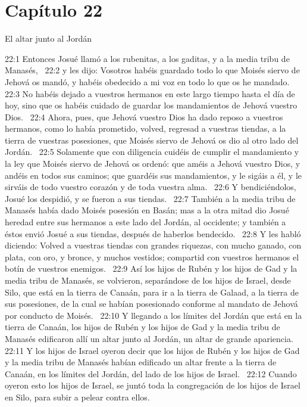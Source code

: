 \section*{Capítulo 22 }
El altar junto al Jordán  

22:1 Entonces Josué llamó a los rubenitas, a los gaditas, y a la media tribu de Manasés,  
22:2 y les dijo: Vosotros habéis guardado todo lo que Moisés siervo de Jehová os mandó, y habéis obedecido a mi voz en todo lo que os he mandado. 
22:3 No habéis dejado a vuestros hermanos en este largo tiempo hasta el día de hoy, sino que os habéis cuidado de guardar los mandamientos de Jehová vuestro Dios.  
22:4 Ahora, pues, que Jehová vuestro Dios ha dado reposo a vuestros hermanos, como lo había prometido, volved, regresad a vuestras tiendas, a la tierra de vuestras posesiones, que Moisés siervo de Jehová os dio al otro lado del Jordán.  
22:5 Solamente que con diligencia cuidéis de cumplir el mandamiento y la ley que Moisés siervo de Jehová os ordenó: que améis a Jehová vuestro Dios, y andéis en todos sus caminos; que guardéis sus mandamientos, y le sigáis a él, y le sirváis de todo vuestro corazón y de toda vuestra alma.  
22:6 Y bendiciéndolos, Josué los despidió, y se fueron a sus tiendas.  
22:7 También a la media tribu de Manasés había dado Moisés posesión en Basán; mas a la otra mitad dio Josué heredad entre sus hermanos a este lado del Jordán, al occidente; y también a éstos envió Josué a sus tiendas, después de haberlos bendecido.  
22:8 Y les habló diciendo: Volved a vuestras tiendas con grandes riquezas, con mucho ganado, con plata, con oro, y bronce, y muchos vestidos; compartid con vuestros hermanos el botín de vuestros enemigos.  
22:9 Así los hijos de Rubén y los hijos de Gad y la media tribu de Manasés, se volvieron, separándose de los hijos de Israel, desde Silo, que está en la tierra de Canaán, para ir a la tierra de Galaad, a la tierra de sus posesiones, de la cual se habían posesionado conforme al mandato de Jehová por conducto de Moisés.  
22:10 Y llegando a los límites del Jordán que está en la tierra de Canaán, los hijos de Rubén y los hijos de Gad y la media tribu de Manasés edificaron allí un altar junto al Jordán, un altar de grande apariencia.  
22:11 Y los hijos de Israel oyeron decir que los hijos de Rubén y los hijos de Gad y la media tribu de Manasés habían edificado un altar frente a la tierra de Canaán, en los límites del Jordán, del lado de los hijos de Israel.  
22:12 Cuando oyeron esto los hijos de Israel, se juntó toda la congregación de los hijos de Israel en Silo, para subir a pelear contra ellos.  
